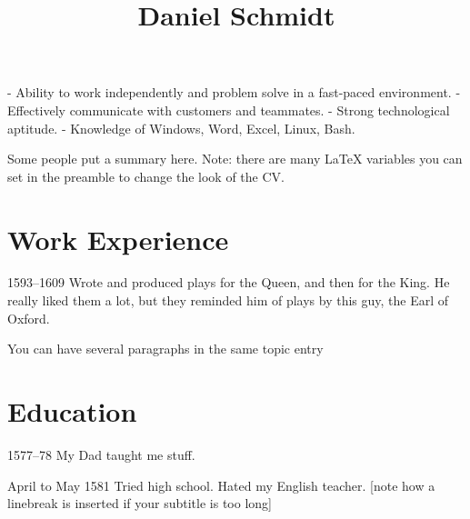 \documentclass{simplecv}
\begin{document}


\title{Daniel Schmidt}

\maketitle
- Ability to work independently and problem solve in a fast-paced environment.
- Effectively communicate with customers and teammates.
- Strong technological aptitude.
- Knowledge of Windows, Word, Excel, Linux, Bash.

Some people put a summary here. Note: there are many \LaTeX{}
variables you can set in the preamble to change the look of the CV.

\section{Work Experience}

\begin{topic}
\item[1593--1609] Wrote and produced plays for the Queen, and then for the
King. He really liked them a lot, but they reminded him of plays by
this guy, the Earl of Oxford.

You can have several paragraphs in the same topic entry
\end{topic}

\section{Education}

\begin{topic}
\item[1577--78] My Dad taught me stuff.
\item[April to May 1581] Tried high school. Hated my English teacher.
[note how a linebreak is inserted if your subtitle is too long]
\end{topic}
\end{document}
